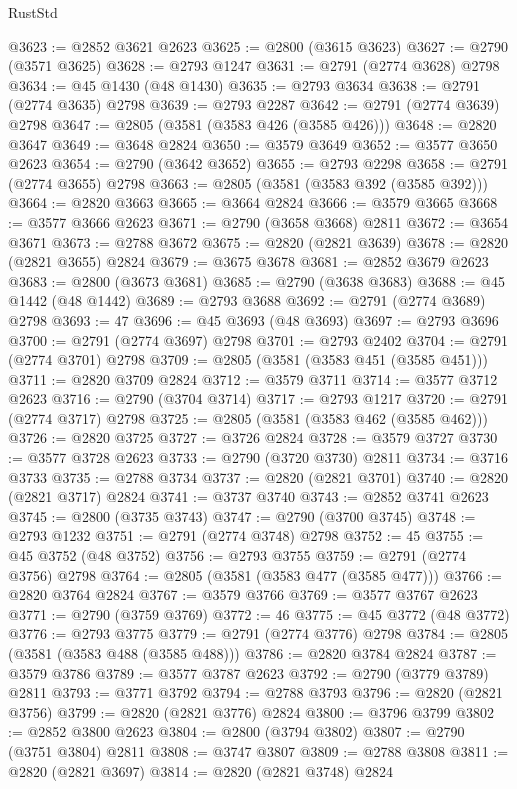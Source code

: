 \begin{lexlean}{RustStd}
\begin{coremodule}
@3623 := @2852 @3621 @2623
@3625 := @2800 (@3615 @3623)
@3627 := @2790 (@3571 @3625)
@3628 := @2793 @1247
@3631 := @2791 (@2774 @3628) @2798
@3634 := @45 @1430 (@48 @1430)
@3635 := @2793 @3634
@3638 := @2791 (@2774 @3635) @2798
@3639 := @2793 @2287
@3642 := @2791 (@2774 @3639) @2798
@3647 := @2805 (@3581 (@3583 @426 (@3585 @426)))
@3648 := @2820 @3647
@3649 := @3648 @2824
@3650 := @3579 @3649
@3652 := @3577 @3650 @2623
@3654 := @2790 (@3642 @3652)
@3655 := @2793 @2298
@3658 := @2791 (@2774 @3655) @2798
@3663 := @2805 (@3581 (@3583 @392 (@3585 @392)))
@3664 := @2820 @3663
@3665 := @3664 @2824
@3666 := @3579 @3665
@3668 := @3577 @3666 @2623
@3671 := @2790 (@3658 @3668) @2811
@3672 := @3654 @3671
@3673 := @2788 @3672
@3675 := @2820 (@2821 @3639)
@3678 := @2820 (@2821 @3655) @2824
@3679 := @3675 @3678
@3681 := @2852 @3679 @2623
@3683 := @2800 (@3673 @3681)
@3685 := @2790 (@3638 @3683)
@3688 := @45 @1442 (@48 @1442)
@3689 := @2793 @3688
@3692 := @2791 (@2774 @3689) @2798
@3693 := 47
@3696 := @45 @3693 (@48 @3693)
@3697 := @2793 @3696
@3700 := @2791 (@2774 @3697) @2798
@3701 := @2793 @2402
@3704 := @2791 (@2774 @3701) @2798
@3709 := @2805 (@3581 (@3583 @451 (@3585 @451)))
@3711 := @2820 @3709 @2824
@3712 := @3579 @3711
@3714 := @3577 @3712 @2623
@3716 := @2790 (@3704 @3714)
@3717 := @2793 @1217
@3720 := @2791 (@2774 @3717) @2798
@3725 := @2805 (@3581 (@3583 @462 (@3585 @462)))
@3726 := @2820 @3725
@3727 := @3726 @2824
@3728 := @3579 @3727
@3730 := @3577 @3728 @2623
@3733 := @2790 (@3720 @3730) @2811
@3734 := @3716 @3733
@3735 := @2788 @3734
@3737 := @2820 (@2821 @3701)
@3740 := @2820 (@2821 @3717) @2824
@3741 := @3737 @3740
@3743 := @2852 @3741 @2623
@3745 := @2800 (@3735 @3743)
@3747 := @2790 (@3700 @3745)
@3748 := @2793 @1232
@3751 := @2791 (@2774 @3748) @2798
@3752 := 45
@3755 := @45 @3752 (@48 @3752)
@3756 := @2793 @3755
@3759 := @2791 (@2774 @3756) @2798
@3764 := @2805 (@3581 (@3583 @477 (@3585 @477)))
@3766 := @2820 @3764 @2824
@3767 := @3579 @3766
@3769 := @3577 @3767 @2623
@3771 := @2790 (@3759 @3769)
@3772 := 46
@3775 := @45 @3772 (@48 @3772)
@3776 := @2793 @3775
@3779 := @2791 (@2774 @3776) @2798
@3784 := @2805 (@3581 (@3583 @488 (@3585 @488)))
@3786 := @2820 @3784 @2824
@3787 := @3579 @3786
@3789 := @3577 @3787 @2623
@3792 := @2790 (@3779 @3789) @2811
@3793 := @3771 @3792
@3794 := @2788 @3793
@3796 := @2820 (@2821 @3756)
@3799 := @2820 (@2821 @3776) @2824
@3800 := @3796 @3799
@3802 := @2852 @3800 @2623
@3804 := @2800 (@3794 @3802)
@3807 := @2790 (@3751 @3804) @2811
@3808 := @3747 @3807
@3809 := @2788 @3808
@3811 := @2820 (@2821 @3697)
@3814 := @2820 (@2821 @3748) @2824

\end{coremodule}
\end{lexlean}
